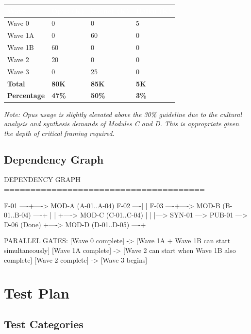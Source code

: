 \documentclass[11pt,letterpaper]{article}
\newcommand{\tableheader}[1]{\textbf{\sffamily\textcolor{white}{#1}}}
\begin{document}
\begin{center}
\begin{tabularx}{\textwidth}{L{4cm}C{2cm}C{2cm}C{2cm}}
\toprule
{}
\tableheader{Wave} & \tableheader{Opus (K)} & \tableheader{Sonnet (K)} & \tableheader{Haiku (K)} \\
\midrule
Wave 0 & 0 & 0 & 5 \\
Wave 1A & 0 & 60 & 0 \\
Wave 1B & 60 & 0 & 0 \\
Wave 2 & 20 & 0 & 0 \\
Wave 3 & 0 & 25 & 0 \\
\midrule
\textbf{Total} & \textbf{80K} & \textbf{85K} & \textbf{5K} \\
\textbf{Percentage} & \textbf{47\%} & \textbf{50\%} & \textbf{3\%} \\
\bottomrule
\end{tabularx}
\end{center}

\textit{Note: Opus usage is slightly elevated above the 30\% guideline due to the cultural analysis and synthesis demands of Modules C and D. This is appropriate given the depth of critical framing required.}

\subsection{Dependency Graph}

\begin{asciibox}
DEPENDENCY GRAPH
======================================

F-01 ----+----> MOD-A (A-01..A-04)
F-02 ----|        |
F-03 ----+----> MOD-B (B-01..B-04)  ----+
         |                               |
         +----> MOD-C (C-01..C-04)       |
         |                               |---> SYN-01 ---> PUB-01 ---> D-06 (Done)
         +----> MOD-D (D-01..D-05) ----+

PARALLEL GATES:
  [Wave 0 complete] -> [Wave 1A + Wave 1B can start simultaneously]
  [Wave 1A complete] -> [Wave 2 can start when Wave 1B also complete]
  [Wave 2 complete] -> [Wave 3 begins]
\end{asciibox}

\section{Test Plan}

\subsection{Test Categories}
\end{document}
